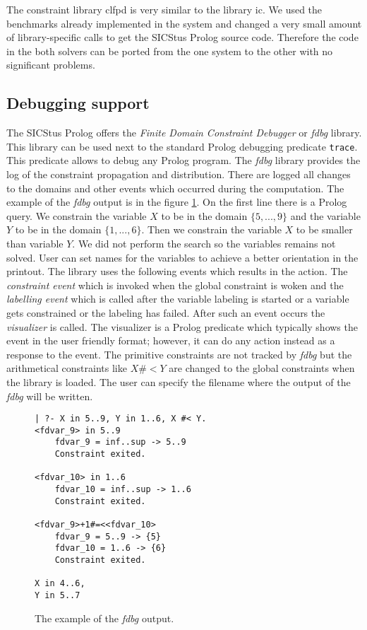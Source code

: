 The constraint library clfpd is very similar to the \eclipse library ic. We used the 
benchmarks already implemented in the \eclipse system and changed a very small amount
of library-specific calls to get the SICStus Prolog source code. Therefore the
code in the both solvers can be ported from the one system to the other with no 
significant problems.    

\subsection{Debugging support}
The SICStus Prolog offers the {\em Finite Domain Constraint Debugger} or {\em fdbg} library.
This library can be used next to the standard Prolog debugging predicate \texttt{trace}. This
predicate allows to debug any Prolog program. The {\em fdbg} library provides the
log of the constraint propagation and distribution. There are logged all changes to the
domains and other events which occurred during the computation. The example of the {\em fdbg}
output is in the figure \ref{sicstus:fdbg}. On the first line there is a Prolog query.
We constrain the variable $X$ to be in the domain $\{5,...,9\}$ and the variable $Y$
to be in the domain $\{1,...,6\}$. Then we constrain the variable $X$ to be smaller than
variable $Y$. We did not perform the search so the variables remains not solved.
User can set names for the variables to achieve a better orientation in the printout.
The library uses the following events which results in the action. The {\em constraint 
event} which is invoked when the global constraint is woken and the {\em labelling event}
which is called after the variable labeling is started or a variable gets constrained
or the labeling has failed. After such an event occurs the {\em visualizer} is called. 
The visualizer is a Prolog predicate which typically shows the event in the user 
friendly format; however, it can do any action instead as a response to the event.
The primitive constraints are not tracked by {\em fdbg} but the arithmetical constraints
like $X \#< Y$ are changed to the global constraints when the library is loaded.
The user can specify the filename where the output of the {\em fdbg} will be written.

\begin{figure}
\caption{\label{sicstus:fdbg}The example of the {\em fdbg} output.}
\begin{verbatim}
| ?- X in 5..9, Y in 1..6, X #< Y.
<fdvar_9> in 5..9
    fdvar_9 = inf..sup -> 5..9
    Constraint exited.

<fdvar_10> in 1..6
    fdvar_10 = inf..sup -> 1..6
    Constraint exited.

<fdvar_9>+1#=<<fdvar_10>
    fdvar_9 = 5..9 -> {5}
    fdvar_10 = 1..6 -> {6}
    Constraint exited.
    
X in 4..6,
Y in 5..7 
\end{verbatim}   
\end{figure}

